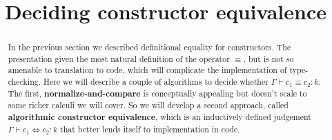 \documentclass{amsart}
\title{Deciding constructor equivalence}
\begin{document}
\maketitle

\begin{abstract}
    In the previous section we described definitional equality for constructors. The presentation given the most natural definition of the operator $\equiv$, but is not so amenable to translation to code, which will complicate the implementation of type-checking. Here we will describe a couple of algorithms to decide whether $\Gamma \vdash c_1 \equiv c_2 : k$. The first, {\bf normalize-and-compare} is conceptually appealing but doesn't scale to some richer calculi we will cover. So we will develop a second approach, called {\bf algorithmic constructor equivalence}, which is an inductively defined judgement $\Gamma \vdash c_1 \iff c_2 : k$ that better lends itself to implementation in code.
\end{abstract}
\end{document}
